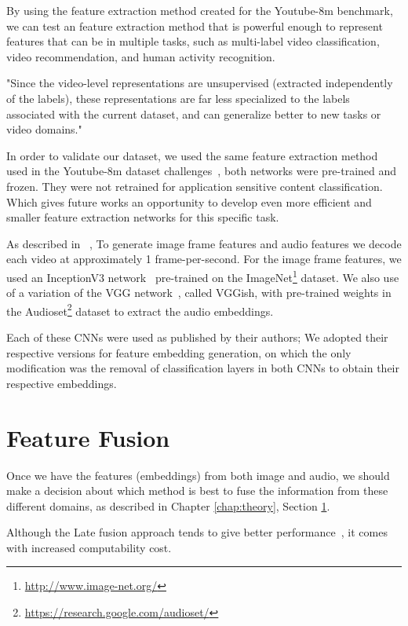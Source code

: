 By using the feature extraction method created for the Youtube-8m benchmark, we can test an feature extraction method that is powerful enough to represent features that can be in multiple tasks, such as multi-label video classification, video recommendation, and human activity recognition.

"Since the video-level representations are unsupervised (extracted independently of the labels), these representations are far less specialized to the labels associated with the current dataset, and can generalize better to new tasks or video domains."~\cite{abu2016youtube}

In order to validate our dataset, we used the same feature extraction method used in the Youtube-8m dataset challenges~\cite{abu2016youtube}, both networks were pre-trained and frozen. They were not retrained for application sensitive content classification. Which gives future works an opportunity to develop even more efficient and smaller feature extraction networks for this specific task.


As described in ~\cite{abu2016youtube},
To generate image frame features and audio features we decode each video at approximately 1 frame-per-second. For the image frame features, we used an InceptionV3  network~\cite{szegedy2016rethinking} pre-trained on the ImageNet\footnote{\url{http://www.image-net.org/}} dataset. We also use of a variation of the VGG network~\cite{simonyan2014VGG}, called VGGish, with pre-trained weights in the Audioset\footnote{\url{https://research.google.com/audioset/}} dataset to extract the audio embeddings.

Each of these CNNs were used as published by their authors; We adopted their respective versions for feature embedding generation, on which the only modification was the removal of classification layers in both CNNs to obtain their respective embeddings.

\section{Feature Fusion}
\label{sec:feature_fusion}

Once we have the features (embeddings) from both image and audio, we should make a decision about which method is best to fuse the information from these different domains, as described in Chapter \ref{chap:theory}, Section \ref{sec:feature_fusion}.

Although the Late fusion approach tends to give better performance~\cite{snoek2005featurefusion}, it comes with increased computability cost.

